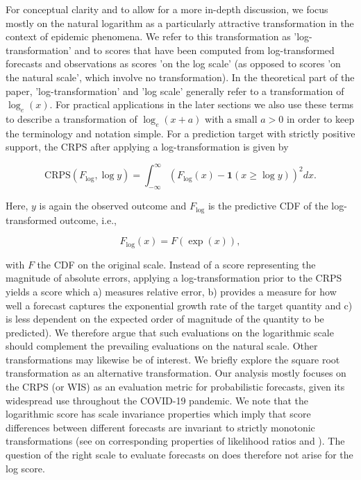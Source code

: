 \documentclass[10pt,letterpaper]{article}
\begin{document}
For conceptual clarity and to allow for a more in-depth discussion, we focus mostly on the natural logarithm as a particularly attractive transformation in the context of epidemic phenomena. We refer to this transformation as 'log-transformation' and to scores that have been computed from log-transformed forecasts and observations as scores 'on the log scale' (as opposed to scores 'on the natural scale', which involve no transformation). In the theoretical part of the paper, 'log-transformation' and 'log scale' generally refer to a transformation of $\log_{e}(x)$. For practical applications in the later sections we also use these terms to describe a transformation of $\log_{e}(x + a)$ with a small $a > 0$ in order to keep the terminology and notation simple. For a prediction target with strictly positive support, the CRPS after applying a log-transformation is given by
%
\begin{linenomath*}
\begin{equation}
    \text{CRPS}(F_{\log}, \log y) = \int_{-\infty}^\infty \left( F_{\log}(x) - \boldsymbol{1}(x \geq \log y) \right)^2 dx.
\end{equation}    
\end{linenomath*}
%
Here, $y$ is again the observed outcome and $F_{\log}$ is the predictive CDF of the log-transformed outcome, i.e.,
\begin{linenomath*}
\begin{equation}
F_{\log}(x) = F(\exp(x)),
\end{equation}    
\end{linenomath*}
with $F$ the CDF on the original scale. Instead of a score representing the magnitude of absolute errors, applying a log-transformation prior to the CRPS yields a score which a) measures relative error, b) provides a measure for how well a forecast captures the exponential growth rate of the target quantity and c) is less dependent on the expected order of magnitude of the quantity to be predicted). 
We therefore argue that such evaluations on the logarithmic scale should complement the prevailing evaluations on the natural scale. 
Other transformations may likewise be of interest. We briefly explore the square root transformation as an alternative transformation. 
Our analysis mostly focuses on the CRPS (or WIS) as an evaluation metric for probabilistic forecasts, given its widespread use throughout the COVID-19 pandemic. We note that the logarithmic score has scale invariance properties which imply that score differences between different forecasts are invariant to strictly monotonic transformations (see \cite{Lehmann1950} on corresponding properties of likelihood ratios and \cite{diksLikelihoodbasedScoringRules2011}). The question of the right scale to evaluate forecasts on does therefore not arise for the log score. 
\end{document}
